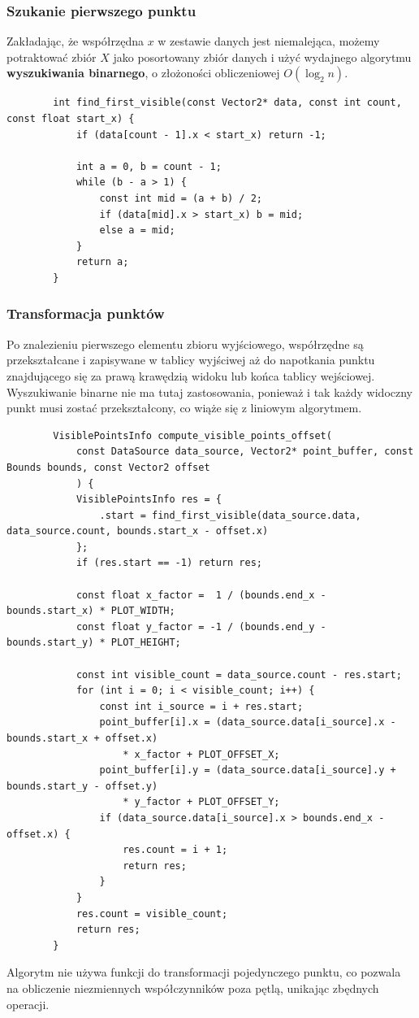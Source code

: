 \documentclass{article}
\begin{document}
	\subsubsection{Szukanie pierwszego punktu}
	Zakładając, że współrzędna $x$ w zestawie danych jest niemalejąca, możemy potraktować zbiór $X$ jako posortowany zbiór danych i użyć wydajnego algorytmu \textbf{wyszukiwania binarnego}, o złożoności obliczeniowej $O(\log_2n)$.
	
	\begin{verbatim}
		int find_first_visible(const Vector2* data, const int count, const float start_x) {
			if (data[count - 1].x < start_x) return -1;
			
			int a = 0, b = count - 1;
			while (b - a > 1) {
				const int mid = (a + b) / 2;
				if (data[mid].x > start_x) b = mid;
				else a = mid;
			}
			return a;
		}
	\end{verbatim}
	
	\subsubsection{Transformacja punktów}
	Po znalezieniu pierwszego elementu zbioru wyjściowego, współrzędne są przekształcane i zapisywane w tablicy wyjściwej aż do napotkania punktu znajdującego się za prawą krawędzią widoku lub końca tablicy wejściowej. Wyszukiwanie binarne nie ma tutaj zastosowania, ponieważ i tak każdy widoczny punkt musi zostać przekształcony, co wiąże się z liniowym algorytmem.
	
	\begin{verbatim}
		VisiblePointsInfo compute_visible_points_offset(
			const DataSource data_source, Vector2* point_buffer, const Bounds bounds, const Vector2 offset
			) {
			VisiblePointsInfo res = {
				.start = find_first_visible(data_source.data, data_source.count, bounds.start_x - offset.x)
			};
			if (res.start == -1) return res;
			
			const float x_factor =  1 / (bounds.end_x - bounds.start_x) * PLOT_WIDTH;
			const float y_factor = -1 / (bounds.end_y - bounds.start_y) * PLOT_HEIGHT;
			
			const int visible_count = data_source.count - res.start;
			for (int i = 0; i < visible_count; i++) {
				const int i_source = i + res.start;
				point_buffer[i].x = (data_source.data[i_source].x - bounds.start_x + offset.x)
					* x_factor + PLOT_OFFSET_X;
				point_buffer[i].y = (data_source.data[i_source].y + bounds.start_y - offset.y)
					* y_factor + PLOT_OFFSET_Y;
				if (data_source.data[i_source].x > bounds.end_x - offset.x) {
					res.count = i + 1;
					return res;
				}
			}
			res.count = visible_count;
			return res;
		}
	\end{verbatim}
	Algorytm nie używa funkcji do transformacji pojedynczego punktu, co pozwala na obliczenie niezmiennych współczynników poza pętlą, unikając zbędnych operacji.
	
\end{document}
